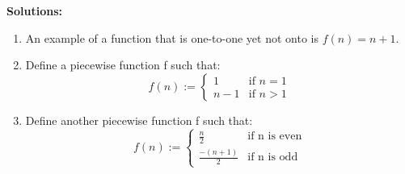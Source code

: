 \documentclass[12 pt]{article}
\begin{document}
\vspace{5mm}

\textbf{Solutions:}
\begin{enumerate}
\item An example of a function that is one-to-one yet not onto is \(f(n) = n + 1\).
\item Define a piecewise function f such that:
\[
f(n) := 
\begin{cases}
1 & \text{if } n = 1 \\
n - 1 & \text{if } n > 1
\end{cases}
\]

\item Define another piecewise function f such that:
\[
f(n) :=
\begin{cases}
\frac{n}{2} & \text{if n is even} \\
\frac{-(n+1)}{2} & \text{if n is odd}
\end{cases}
\]

\end{enumerate}
\end{document}
